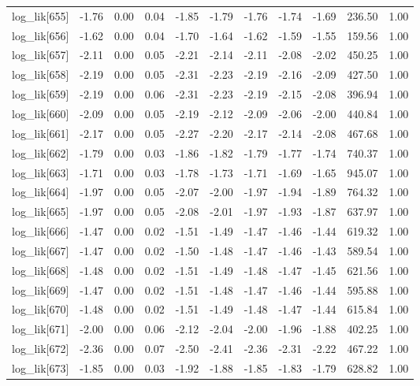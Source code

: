 \begin{table}[ht]
\begin{tabular}{rrrrrrrrrrr}
  log\_lik[655] & -1.76 & 0.00 & 0.04 & -1.85 & -1.79 & -1.76 & -1.74 & -1.69 & 236.50 & 1.00 \\ 
  log\_lik[656] & -1.62 & 0.00 & 0.04 & -1.70 & -1.64 & -1.62 & -1.59 & -1.55 & 159.56 & 1.00 \\ 
  log\_lik[657] & -2.11 & 0.00 & 0.05 & -2.21 & -2.14 & -2.11 & -2.08 & -2.02 & 450.25 & 1.00 \\ 
  log\_lik[658] & -2.19 & 0.00 & 0.05 & -2.31 & -2.23 & -2.19 & -2.16 & -2.09 & 427.50 & 1.00 \\ 
  log\_lik[659] & -2.19 & 0.00 & 0.06 & -2.31 & -2.23 & -2.19 & -2.15 & -2.08 & 396.94 & 1.00 \\ 
  log\_lik[660] & -2.09 & 0.00 & 0.05 & -2.19 & -2.12 & -2.09 & -2.06 & -2.00 & 440.84 & 1.00 \\ 
  log\_lik[661] & -2.17 & 0.00 & 0.05 & -2.27 & -2.20 & -2.17 & -2.14 & -2.08 & 467.68 & 1.00 \\ 
  log\_lik[662] & -1.79 & 0.00 & 0.03 & -1.86 & -1.82 & -1.79 & -1.77 & -1.74 & 740.37 & 1.00 \\ 
  log\_lik[663] & -1.71 & 0.00 & 0.03 & -1.78 & -1.73 & -1.71 & -1.69 & -1.65 & 945.07 & 1.00 \\ 
  log\_lik[664] & -1.97 & 0.00 & 0.05 & -2.07 & -2.00 & -1.97 & -1.94 & -1.89 & 764.32 & 1.00 \\ 
  log\_lik[665] & -1.97 & 0.00 & 0.05 & -2.08 & -2.01 & -1.97 & -1.93 & -1.87 & 637.97 & 1.00 \\ 
  log\_lik[666] & -1.47 & 0.00 & 0.02 & -1.51 & -1.49 & -1.47 & -1.46 & -1.44 & 619.32 & 1.00 \\ 
  log\_lik[667] & -1.47 & 0.00 & 0.02 & -1.50 & -1.48 & -1.47 & -1.46 & -1.43 & 589.54 & 1.00 \\ 
  log\_lik[668] & -1.48 & 0.00 & 0.02 & -1.51 & -1.49 & -1.48 & -1.47 & -1.45 & 621.56 & 1.00 \\ 
  log\_lik[669] & -1.47 & 0.00 & 0.02 & -1.51 & -1.48 & -1.47 & -1.46 & -1.44 & 595.88 & 1.00 \\ 
  log\_lik[670] & -1.48 & 0.00 & 0.02 & -1.51 & -1.49 & -1.48 & -1.47 & -1.44 & 615.84 & 1.00 \\ 
  log\_lik[671] & -2.00 & 0.00 & 0.06 & -2.12 & -2.04 & -2.00 & -1.96 & -1.88 & 402.25 & 1.00 \\ 
  log\_lik[672] & -2.36 & 0.00 & 0.07 & -2.50 & -2.41 & -2.36 & -2.31 & -2.22 & 467.22 & 1.00 \\ 
  log\_lik[673] & -1.85 & 0.00 & 0.03 & -1.92 & -1.88 & -1.85 & -1.83 & -1.79 & 628.82 & 1.00 \\ 

\end{tabular}
\end{table}
